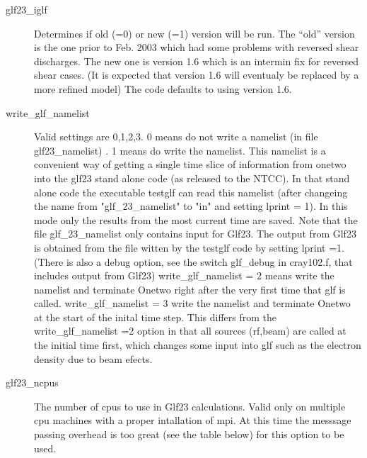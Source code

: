 \documentclass[12pt]{article}
\begin{document}
     \begin{description}
       \item [glf23\_iglf] Determines if old (=0) or new (=1)
           version will be run. The ``old'' version is the one prior
           to Feb. 2003 which had some problems with reversed shear
           discharges. The new one is version 1.6 which is an intermin
           fix for reversed shear cases. (It is expected that version
           1.6 will eventualy be replaced by a more refined model)
           The code defaults to using version 1.6. 
       \item [write\_glf\_namelist] Valid settings are 0,1,2,3.
           0 means do not 
             write a namelist (in file glf23\_namelist) .
                   1 means do write the namelist.
                    This namelist is a convenient way of getting
                     a single time slice of information from onetwo
                    into the glf23 stand alone code (as released to
                    the NTCC). In that stand alone code the
                    executable testglf can read this namelist (after changeing
                    the name from "glf\_23\_namelist" to "in" 
                    and setting lprint = 1). In this mode only the
                    results from  the most current time are saved.
                    Note  that the file glf\_23\_namelist only
                    contains input for Glf23. The output from Glf23 is
                    obtained from the file witten by the testglf code
                    by setting lprint =1. (There is also a debug
                    option, see the switch glf\_debug in cray102.f,
                    that includes output from Glf23)
            write\_glf\_namelist = 2  means write the namelist and terminate Onetwo
                   right after the very first time that glf is called.
            write\_glf\_namelist =  3  write the namelist and terminate Onetwo
                   at the start of the inital time step.
                   This differs from the  write\_glf\_namelist =2 
                   option in that all sources (rf,beam)
                   are called at the initial time first, which changes
                   some input into glf such as the electron density
                   due to beam efects.
   \item [ glf23\_ncpus ]  The  number of cpus to use in Glf23 calculations.
                    Valid only on multiple cpu machines with a proper
                    intallation of mpi. At this time the messsage
                    passing overhead is too great (see the table
                    below) for this option to be  used.
     \end{description}
\end{document}
